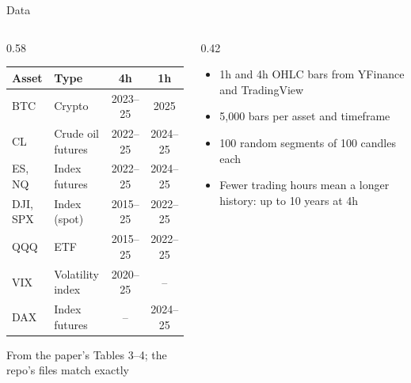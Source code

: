 \documentclass{beamer}
\begin{document}
    \begin{frame}{Data}
        \footnotesize
        \begin{columns}[T]
            \begin{column}{0.58\linewidth}
                \scriptsize
                \setlength{\tabcolsep}{4pt}
                \begin{tabular}{@{}llcc@{}}
                    \toprule
                    Asset & Type & 4h & 1h \\
                    \midrule
                    BTC & Crypto & 2023--25 & 2025 \\
                    CL & Crude oil futures & 2022--25 & 2024--25 \\
                    ES, NQ & Index futures & 2022--25 & 2024--25 \\
                    DJI, SPX & Index (spot) & 2015--25 & 2022--25 \\
                    QQQ & ETF & 2015--25 & 2022--25 \\
                    VIX & Volatility index & 2020--25 & -- \\
                    DAX & Index futures & -- & 2024--25 \\
                    \bottomrule
                \end{tabular}

                \vspace{0.4em}
                {\tiny From the paper's Tables 3--4; the repo's files match exactly\par}
            \end{column}
            \begin{column}{0.42\linewidth}
                \begin{itemize}
                    \item 1h and 4h OHLC bars from YFinance and TradingView
                    \item 5,000 bars per asset and timeframe
                    \item 100 random segments of 100 candles each
                    \item Fewer trading hours mean a longer history: up to 10 years at 4h
                \end{itemize}
            \end{column}
        \end{columns}


\end{frame}
\end{document}
